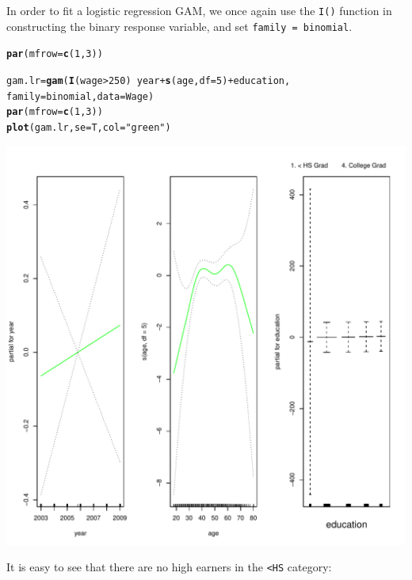 \documentclass[12pt]{article}\usepackage[]{graphicx}\usepackage[]{color}
\makeatletter
\def\maxwidth{ %
  \ifdim\Gin@nat@width>\linewidth
    \linewidth
  \else
    \Gin@nat@width
  \fi
}
\newcommand{\hlnum}[1]{\textcolor[rgb]{0.686,0.059,0.569}{#1}}%
\newcommand{\hlstr}[1]{\textcolor[rgb]{0.192,0.494,0.8}{#1}}%
\newcommand{\hlopt}[1]{\textcolor[rgb]{0,0,0}{#1}}%
\newcommand{\hlstd}[1]{\textcolor[rgb]{0.345,0.345,0.345}{#1}}%
\newcommand{\hlkwb}[1]{\textcolor[rgb]{0.69,0.353,0.396}{#1}}%
\newcommand{\hlkwc}[1]{\textcolor[rgb]{0.333,0.667,0.333}{#1}}%
\newcommand{\hlkwd}[1]{\textcolor[rgb]{0.737,0.353,0.396}{\textbf{#1}}}%
\newenvironment{kframe}{%
 \def\at@end@of@kframe{}%
 \ifinner\ifhmode%
  \def\at@end@of@kframe{\end{minipage}}%
  \begin{minipage}{\columnwidth}%
 \fi\fi%
 \def\FrameCommand##1{\hskip\@totalleftmargin \hskip-\fboxsep
 \colorbox{shadecolor}{##1}\hskip-\fboxsep
     \hskip-\linewidth \hskip-\@totalleftmargin \hskip\columnwidth}%
 \MakeFramed {\advance\hsize-\width
   \@totalleftmargin\z@ \linewidth\hsize
   \@setminipage}}%
 {\par\unskip\endMakeFramed%
 \at@end@of@kframe}
\newenvironment{knitrout}{}{} %
\makeatother
\begin{document}
In order to fit a logistic regression GAM, we once again use the \texttt{I()} function in constructing the binary response variable, and set \texttt{family = binomial}.

\begin{knitrout}
\color{fgcolor}\begin{kframe}
\begin{alltt}
\hlkwd{par}\hlstd{(}\hlkwc{mfrow}\hlstd{=}\hlkwd{c}\hlstd{(}\hlnum{1}\hlstd{,}\hlnum{3}\hlstd{))}

\hlstd{gam.lr}\hlkwb{=}\hlkwd{gam}\hlstd{(}\hlkwd{I}\hlstd{(wage}\hlopt{>}\hlnum{250}\hlstd{)}\hlopt{~}\hlstd{year}\hlopt{+}\hlkwd{s}\hlstd{(age,}\hlkwc{df}\hlstd{=}\hlnum{5}\hlstd{)}\hlopt{+}\hlstd{education,}
           \hlkwc{family} \hlstd{= binomial,} \hlkwc{data} \hlstd{= Wage)}
\hlkwd{par}\hlstd{(}\hlkwc{mfrow}\hlstd{=}\hlkwd{c}\hlstd{(}\hlnum{1}\hlstd{,}\hlnum{3}\hlstd{))}
\hlkwd{plot}\hlstd{(gam.lr,} \hlkwc{se}\hlstd{=T,} \hlkwc{col}\hlstd{=}\hlstr{"green"}\hlstd{)}
\end{alltt}
\end{kframe}
\includegraphics[width=\maxwidth]{figure/unnamed-chunk-33-1} 

\end{knitrout}

It is easy to see that there are no high earners in the \texttt{<HS} category:
\end{document}
